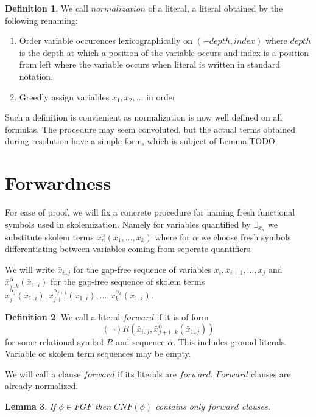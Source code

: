 \documentclass[english, shortabstract]{iithesis}
\theoremstyle{definition} \newtheorem{definition}{Definition}[chapter]
\theoremstyle{remark} \newtheorem{remark}[definition]{Observation}
\theoremstyle{plain} \newtheorem{theorem}[definition]{Theorem}
\theoremstyle{plain} \newtheorem{lemma}[definition]{Lemma}
\begin{document}
\begin{definition}
We call $normalization$ of a literal, a literal obtained by the following renaming:
\begin{enumerate}
    \item Order variable occurences lexicographically on $(-depth, index)$ 
    where $depth$ is the depth at which a position of the variable occurs and index is a position from left where the variable occurs when literal is written in standard notation.
    \item Greedly assign variables $x_1, x_2, \dots$ in order
\end{enumerate}
\end{definition}

Such a definition is convienient as normalization is now well defined on all formulas. 
The procedure may seem convoluted, but the actual terms obtained during resolution have a simple form, which is subject of Lemma.TODO.

\section{Forwardness}

For ease of proof, we will fix a concrete procedure for naming fresh functional symbols used in skolemization. 
Namely for variables quantified by $\exists_{x_n}$ we substitute skolem terms $x^\alpha_n(x_1, \dots, x_{k})$ where 
for $\alpha$ we choose fresh symbols differentiating between variables coming from seperate quantifiers.

We will write $\bar{x}_{i..j}$ for the gap-free sequence of variables $x_i, x_{i+1}, \dots, x_j$ and 
$\bar{x}^{\bar{\alpha}}_{j..k}(\bar{x}_{1..i})$ for the gap-free sequence of skolem terms $x^{\alpha_j}_{j}(\bar{x}_{1..i}), x^{\alpha_{j+1}}_{j+1}(\bar{x}_{1..i}), \dots, x^{\alpha_k}_k(\bar{x}_{1..i})$.

\begin{definition}
We call a literal $forward$ if it is of form
$$(\lnot)R(\bar{x}_{i..j}, \bar{x}^{\bar{\alpha}}_{{j+1..k}}(\bar{x}_{1..j}))$$
for some relational symbol $R$ and sequence $\bar{\alpha}$. This includes ground literals. Variable or skolem term sequences may be empty.
\end{definition}

We will call a clause $forward$ if its literals are $forward$. $Forward$ clauses are already normalized.

\begin{lemma}
If $\phi \in FGF$ then $CNF(\phi)$ contains only $forward$ clauses.
\end{lemma}
\end{document}
